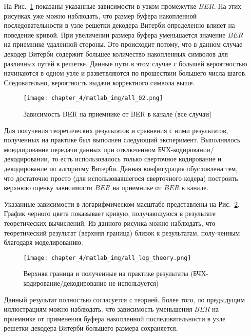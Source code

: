На Рис.~\ref{img_11} показаны указанные зависимости в узком промежутке $BER$. На этих рисунках уже можно наблюдать, что размер буфера
накопленной последовательности в узле решетки декодера Витерби определенно влияет на поведение кривой. При увеличении размера
буфера уменьшается значение $BER$ на приемнике удаленной стороны. Это происходит потому, что в данном случае декодер Витерби
содержит большее количество накопленных символов для различных путей в решетке. Данные пути в этом случае с большей вероятностью
начинаются в одном узле и разветвляются по прошествии большего числа шагов. Следовательно, вероятность выдачи корректного символа выше.
\begin{figure}[h]
\begin{center}
\texttt{[image: chapter\_4/matlab\_img/all\_02.png]}
\caption{Зависимость BER на приемнике от BER в канале (все случаи)}
\label{img_11}
\end{center}
\end{figure}

Для получения теоретических результатов и сравнения с ними результатов, полученных на практике был выполнен следующий
эксперимент. Выполнялось моедлирование передачи данных при отключенном БЧХ-кодировании/декодировании, то есть использовалось
только сверточное кодирование и декодирование по алгоритму Витерби. Данная конфигурация обусловлена тем, что достаточно
просто (для использовавшегося сверточного кодера) построить верхнюю оценку зависимости $BER$ на приемнике от $BER$ в канале.

Указанные зависимости в логарифмическом масштабе представлены на Рис.~\ref{img_12}. График черного цвета показывает кривую,
получающуюся в результате теоретических вычислений. Из данного рисунка можно наблюдать, что теоретический результат
(верхняя граница) близок к результатам, полу-ченным благодаря моделированию.
\begin{figure}[h]
\begin{center}
\texttt{[image: chapter\_4/matlab\_img/all\_log\_theory.png]}
\caption{Верхняя граница и полученные на практике результаты (БЧХ-кодирование/декодирование не используется)}
\label{img_12}
\end{center}
\end{figure}

Данный результат полностью согласуется с теорией. Более того, по предыдущим иллюстрациям можно наблюдать, что
зависимость уменьшения $BER$ на приемнике от применения буфера накопленной последовательности в узле решетки
декодера Витерби большего размера сохраняется.